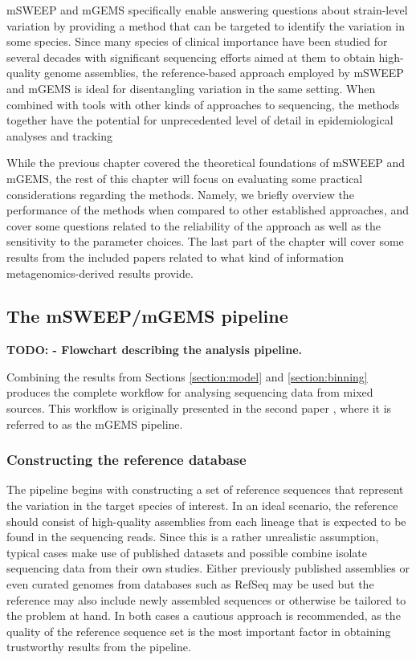 \documentclass[officiallayout]{tktla}
\begin{document}
mSWEEP and mGEMS specifically enable answering questions about
strain-level variation by providing a method that can be targeted to
identify the variation in some species. Since many species of clinical
importance have been studied for several decades with significant
sequencing efforts aimed at them to obtain high-quality genome
assemblies, the reference-based approach employed by mSWEEP and mGEMS
is ideal for disentangling variation in the same setting. When
combined with tools with other kinds of approaches to sequencing, the
methods together have the potential for unprecedented level of detail
in epidemiological analyses and tracking

While the previous chapter covered the theoretical foundations of
mSWEEP and mGEMS, the rest of this chapter will focus on evaluating
some practical considerations regarding the methods. Namely, we
briefly overview the performance of the methods when compared to other
established approaches, and cover some questions related to the
reliability of the approach as well as the sensitivity to the
parameter choices. The last part of the chapter will cover some
results from the included papers related to what kind of information
metagenomics-derived results provide.


\subsection{The mSWEEP/mGEMS pipeline}

\textbf{TODO: - Flowchart describing the analysis pipeline.}

Combining the results from Sections \ref{section:model} and
\ref{section:binning} produces the complete workflow for analysing
sequencing data from mixed sources. This workflow is originally
presented in the second paper \citep{maklin_bacterial_2021}, where it
is referred to as the mGEMS pipeline.

\subsubsection{Constructing the reference database}

The pipeline begins with constructing a set of reference sequences
that represent the variation in the target species of interest. In an
ideal scenario, the reference should consist of high-quality
assemblies from each lineage that is expected to be found in the
sequencing reads. Since this is a rather unrealistic assumption,
typical cases make use of published datasets and possible combine
isolate sequencing data from their own studies. Either previously
published assemblies or even curated genomes from databases such as
RefSeq may be used but the reference may also include newly assembled
sequences or otherwise be tailored to the problem at hand. In both
cases a cautious approach is recommended, as the quality of the
reference sequence set is the most important factor in obtaining
trustworthy results from the pipeline.
\end{document}
